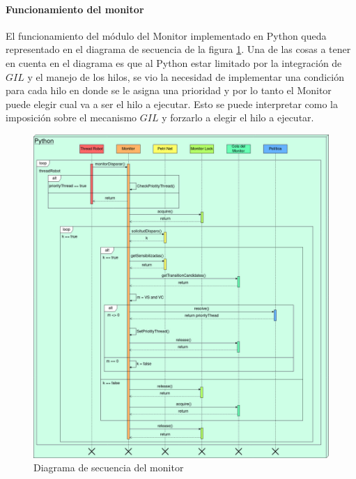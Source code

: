 \paragraph{Funcionamiento del monitor} \mbox{} \vspace{8pt}

El funcionamiento del módulo del Monitor implementado en Python queda representado en el diagrama de secuencia de la figura \ref{fig:diagrama_monitor}.
Una de las cosas a tener en cuenta en el diagrama es que al Python estar limitado por la integración de $GIL$ y el manejo de los hilos, se vio la necesidad de implementar una condición para cada hilo en donde se le asigna una prioridad y por lo tanto el Monitor puede elegir cual va a ser el hilo a ejecutar. Esto se puede interpretar como la imposición sobre el mecanismo $GIL$ y forzarlo a elegir el hilo a ejecutar.

\begin{figure}[H]
    \centering
    \hspace*{-0,8cm}
    \includegraphics[width=1.2\linewidth]{images/diagrama_monitor.jpg}
    \caption{Diagrama de secuencia del monitor}
    \label{fig:diagrama_monitor}
\end{figure}

